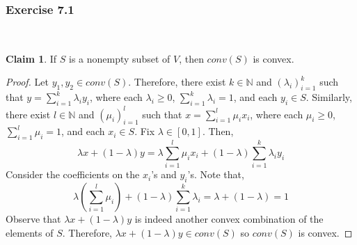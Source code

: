 \documentclass[letterpaper,12pt]{article}
\theoremstyle{definition}
\newtheorem{claim}[theorem]{Claim}
\begin{document}
\subsubsection*{Exercise 7.1}\
\begin{claim}
	If $S$ is a nonempty subset of $V$, then $conv(S)$ is convex.
\end{claim}
\begin{proof}
	Let $y_1, y_2 \in conv(S)$. Therefore, there exist $k \in \mathbb{N}$ and $(\lambda_i)_{i=1}^k$ such that $y = \sum_{i=1}^k \lambda_i y_i$, where each $\lambda_i \geq 0$, $\sum_{i=1}^{k} \lambda_i = 1$, and each $y_i \in S$. Similarly, there exist $l \in \mathbb{N}$ and $(\mu_i)_{i=1}^l$ such that $x = \sum_{i=1}^l \mu_i x_i$, where each $\mu_i \geq 0$, $\sum_{i=1}^{l} \mu_i = 1$, and each $x_i \in S$. Fix $\lambda \in [0,1]$. Then,
	\begin{equation}
	\lambda x+ (1 - \lambda)y = \lambda\sum_{i=1}^l \mu_i x_i + (1 - \lambda) \sum_{i=1}^k \lambda_i y_i
	\end{equation}
	Consider the coefficients on the $x_i$'s and $y_i$'s. Note that,
	\begin{equation}
	\lambda( \sum_{i=1}^l \mu_i ) + (1 - \lambda) \sum_{i=1}^k \lambda_i = \lambda + (1 - \lambda) = 1
	\end{equation}
	Observe that $\lambda x+ (1 - \lambda)y$ is indeed another convex combination of the elements of $S$. Therefore, $\lambda x+ (1 - \lambda)y \in conv(S)$ so $conv(S)$ is convex.
\end{proof}
\end{document}
